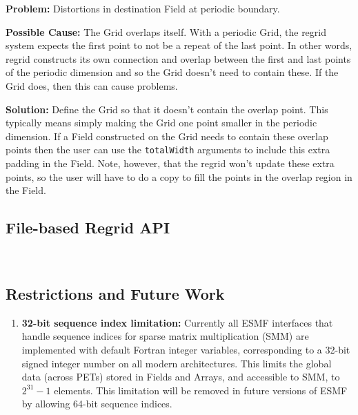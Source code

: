  \bigskip
 
 {\bf Problem:} Distortions in destination Field at periodic boundary.

 \medskip

 {\bf Possible Cause:} The Grid overlaps itself. With a periodic Grid, the regrid system expects
  the first point to not be a repeat of the last point. In other words,
  regrid constructs its own connection and overlap between the first and last points of the
  periodic dimension and so the Grid doesn't need to contain these. If the Grid does, then this
  can cause problems. 

 \smallskip

 {\bf Solution:} Define the Grid so that it doesn't contain the overlap point. This typically means simply making
 the Grid one point smaller in the periodic dimension.  If a Field 
 constructed on the Grid needs to contain these overlap points then the user can use the
 {\tt totalWidth} arguments to include this extra padding in the Field. Note, however, 
 that the regrid won't update these extra points, so the user will have to do a copy to fill the points
 in the overlap region in the Field.  


\subsection{File-based Regrid API}~\label{sec:filebasedregrid}


\subsection{Restrictions and Future Work}
\begin{enumerate}

\item {\bf 32-bit sequence index limitation:} Currently all ESMF interfaces that handle sequence indices for sparse matrix multiplication (SMM) are implemented with default Fortran integer variables, corresponding to a 32-bit signed integer number on all modern architectures. This limits the global data (across PETs) stored in Fields and Arrays, and accessible to SMM, to $2^{31}-1$ elements. This limitation will be removed in future versions of ESMF by allowing 64-bit sequence indices.

\end{enumerate}
